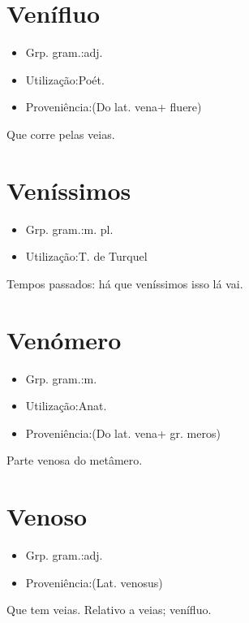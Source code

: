 \documentclass{article}
\begin{document}
\section{Venífluo}
\begin{itemize}
\item {Grp. gram.:adj.}
\end{itemize}
\begin{itemize}
\item {Utilização:Poét.}
\end{itemize}
\begin{itemize}
\item {Proveniência:(Do lat. \textunderscore vena\textunderscore  + \textunderscore fluere\textunderscore )}
\end{itemize}
Que corre pelas veias.
\section{Veníssimos}
\begin{itemize}
\item {Grp. gram.:m. pl.}
\end{itemize}
\begin{itemize}
\item {Utilização:T. de Turquel}
\end{itemize}
Tempos passados: \textunderscore há que veníssimos isso lá vai\textunderscore .
\section{Venómero}
\begin{itemize}
\item {Grp. gram.:m.}
\end{itemize}
\begin{itemize}
\item {Utilização:Anat.}
\end{itemize}
\begin{itemize}
\item {Proveniência:(Do lat. \textunderscore vena\textunderscore  + gr. \textunderscore meros\textunderscore )}
\end{itemize}
Parte venosa do metâmero.
\section{Venoso}
\begin{itemize}
\item {Grp. gram.:adj.}
\end{itemize}
\begin{itemize}
\item {Proveniência:(Lat. \textunderscore venosus\textunderscore )}
\end{itemize}
Que tem veias.
Relativo a veias; venífluo.
\end{document}
